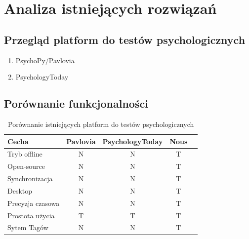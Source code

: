 \documentclass[12pt, a4paper, oneside]{report}
\begin{document}
\chapter{Analiza istniejących rozwiązań}
\label{chap:analiza}


\section{Przegląd platform do testów psychologicznych}
\label{sec:przeglad}

\begin{enumerate}
  \item PsychoPy\slash Pavlovia
  \item PsychologyToday
\end{enumerate}
 
%


\section{Porównanie funkcjonalności}
\label{sec:porownanie}

%
 \begin{table}[H]
   \centering
   \caption{Porównanie istniejących platform do testów psychologicznych}
   \label{tab:porownanie}
   \begin{tabular}{lcccc}
     \toprule
    \textbf{Cecha} & \textbf{Pavlovia} & \textbf{PsychologyToday} & \textbf{Nous} \\
     \midrule
     Tryb offline       &N &N &T  \\
     Open-source        &N &N &T  \\
     Synchronizacja     &N &N &T  \\
     Desktop            &N &N &T  \\
     Precyzja czasowa   &N &N &T  \\
     Prostota użycia    &T &T &T  \\
     Sytem Tagów        &N &N &T   \\
     \bottomrule
   \end{tabular}
 \end{table}
\end{document}
